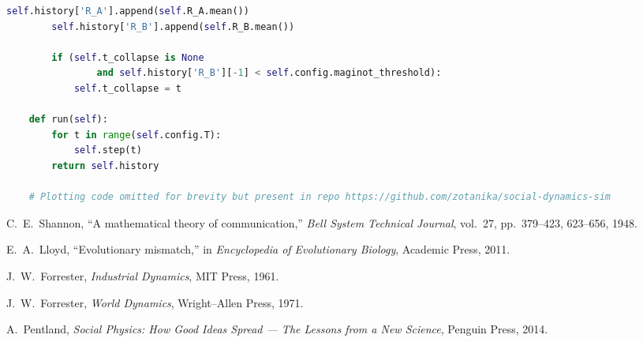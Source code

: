 \documentclass[11pt]{article}
\theoremstyle{plain}
\begin{document}
\begin{lstlisting}[language=Python, caption=Social Dynamics Simulation Code (v2)]
        self.history['R_A'].append(self.R_A.mean())
        self.history['R_B'].append(self.R_B.mean())

        if (self.t_collapse is None 
                and self.history['R_B'][-1] < self.config.maginot_threshold):
            self.t_collapse = t

    def run(self):
        for t in range(self.config.T):
            self.step(t)
        return self.history
    
    # Plotting code omitted for brevity but present in repo https://github.com/zotanika/social-dynamics-sim
\end{lstlisting}

\begin{thebibliography}{9}

C.~E.~Shannon,
``A mathematical theory of communication,''
\emph{Bell System Technical Journal}, vol.~27, pp.~379--423, 623--656, 1948.

E.~A.~Lloyd,
``Evolutionary mismatch,''
in \emph{Encyclopedia of Evolutionary Biology},
Academic Press, 2011.

J.~W.~Forrester,
\emph{Industrial Dynamics},
MIT Press, 1961.

J.~W.~Forrester,
\emph{World Dynamics},
Wright--Allen Press, 1971.

A.~Pentland,
\emph{Social Physics: How Good Ideas Spread --- The Lessons from a New Science},
Penguin Press, 2014.

\end{thebibliography}
\end{document}
